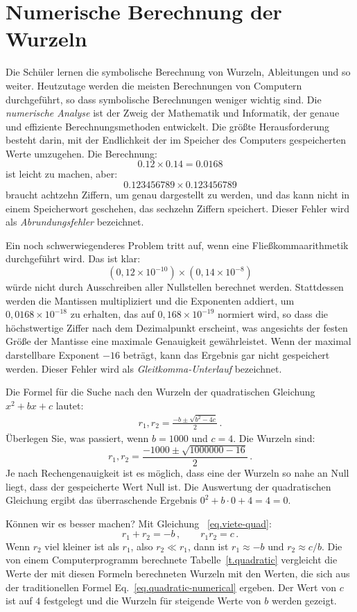 \section{Numerische Berechnung der Wurzeln}\label{s.numerical}

Die Schüler lernen die symbolische Berechnung von Wurzeln, Ableitungen und so weiter. Heutzutage werden die meisten Berechnungen von Computern durchgeführt, so dass symbolische Berechnungen weniger wichtig sind. Die \emph{numerische Analyse} ist der Zweig der Mathematik und Informatik, der genaue und effiziente Berechnungsmethoden entwickelt. Die größte Herausforderung besteht darin, mit der Endlichkeit der im Speicher des Computers gespeicherten Werte umzugehen. Die Berechnung:
\[0.12\times 0.14=0.0168\]
ist leicht zu machen, aber:
\[
0.123456789\times 0.123456789
\]
braucht achtzehn Ziffern, um genau dargestellt zu werden, und das kann nicht in einem Speicherwort geschehen, das sechzehn Ziffern speichert. Dieser Fehler wird als \emph{Abrundungsfehler} bezeichnet.

Ein noch schwerwiegenderes Problem tritt auf, wenn eine Fließkommaarithmetik durchgeführt wird. Das ist klar:
\[(0,12\times 10^{-10})\times (0,14\times 10^{-8})\]
würde nicht durch Ausschreiben aller Nullstellen berechnet werden. Stattdessen werden die Mantissen multipliziert und die Exponenten addiert, um $0,0168\times 10^{-18}$ zu erhalten, das auf $0,168\times 10^{-19}$ normiert wird, so dass die höchstwertige Ziffer nach dem Dezimalpunkt erscheint, was angesichts der festen Größe der Mantisse eine maximale Genauigkeit gewährleistet. Wenn der maximal darstellbare Exponent $-16$ beträgt, kann das Ergebnis gar nicht gespeichert werden. Dieser Fehler wird als \emph{Gleitkomma-Unterlauf} bezeichnet.

Die Formel für die Suche nach den Wurzeln der quadratischen Gleichung $x^2+bx+c$ lautet:
\begin{align}
r_1, r_2 = \frac{-b\pm\sqrt{b^2-4c}}{2}\,.\label{eq.quadratic-numerical}
\end{align}
Überlegen Sie, was passiert, wenn $b=1000$ und $c=4$. Die Wurzeln sind:
\[
r_1, r_2 = \frac{-1000\pm\sqrt{1000000-16}}{2}\,.
\]
Je nach Rechengenauigkeit ist es möglich, dass eine der Wurzeln so nahe an Null liegt, dass der gespeicherte Wert Null ist. Die Auswertung der quadratischen Gleichung ergibt das überraschende Ergebnis $0^2+b\cdot 0 +4= 4= 0$.

Können wir es besser machen? Mit Gleichung ~\ref{eq.viete-quad}:
\[
r_1+r_2 = -b\,,\quad\quad r_1r_2=c\,.
\]
Wenn $r_2$ viel kleiner ist als $r_1$, also $r_2\ll r_1$, dann ist $r_1\approx -b$ und $r_2\approx c/b$. Die von einem Computerprogramm berechnete Tabelle~\ref{t.quadratic} vergleicht die Werte der mit diesen Formeln berechneten Wurzeln mit den Werten, die sich aus der traditionellen Formel Eq.~\ref{eq.quadratic-numerical} ergeben. Der Wert von $c$ ist auf $4$ festgelegt und die Wurzeln für steigende Werte von $b$ werden gezeigt.

